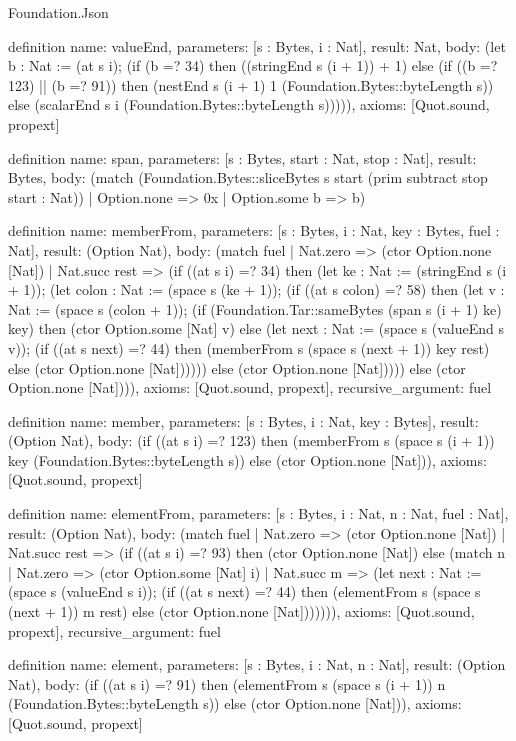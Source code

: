 \begin{lexlean}{Foundation.Json}
\begin{semanticmodule}
definition{
  name: valueEnd,
  parameters: [s : Bytes, i : Nat],
  result: Nat,
  body: (let b : Nat := (at s i); (if (b =? 34) then ((stringEnd s (i + 1)) + 1) else (if ((b =? 123) || (b =? 91)) then (nestEnd s (i + 1) 1 (Foundation.Bytes::byteLength s)) else (scalarEnd s i (Foundation.Bytes::byteLength s))))),
  axioms: [Quot.sound, propext]
}

definition{
  name: span,
  parameters: [s : Bytes, start : Nat, stop : Nat],
  result: Bytes,
  body: (match (Foundation.Bytes::sliceBytes s start (prim subtract stop start : Nat))
    | Option.none => 0x
    | Option.some b => b)
}

definition{
  name: memberFrom,
  parameters: [s : Bytes, i : Nat, key : Bytes, fuel : Nat],
  result: (Option Nat),
  body: (match fuel
    | Nat.zero => (ctor Option.none [Nat])
    | Nat.succ rest => (if ((at s i) =? 34) then (let ke : Nat := (stringEnd s (i + 1)); (let colon : Nat := (space s (ke + 1)); (if ((at s colon) =? 58) then (let v : Nat := (space s (colon + 1)); (if (Foundation.Tar::sameBytes (span s (i + 1) ke) key) then (ctor Option.some [Nat] v) else (let next : Nat := (space s (valueEnd s v)); (if ((at s next) =? 44) then (memberFrom s (space s (next + 1)) key rest) else (ctor Option.none [Nat]))))) else (ctor Option.none [Nat])))) else (ctor Option.none [Nat]))),
  axioms: [Quot.sound, propext],
  recursive_argument: fuel
}

definition{
  name: member,
  parameters: [s : Bytes, i : Nat, key : Bytes],
  result: (Option Nat),
  body: (if ((at s i) =? 123) then (memberFrom s (space s (i + 1)) key (Foundation.Bytes::byteLength s)) else (ctor Option.none [Nat])),
  axioms: [Quot.sound, propext]
}

definition{
  name: elementFrom,
  parameters: [s : Bytes, i : Nat, n : Nat, fuel : Nat],
  result: (Option Nat),
  body: (match fuel
    | Nat.zero => (ctor Option.none [Nat])
    | Nat.succ rest => (if ((at s i) =? 93) then (ctor Option.none [Nat]) else (match n
      | Nat.zero => (ctor Option.some [Nat] i)
      | Nat.succ m => (let next : Nat := (space s (valueEnd s i)); (if ((at s next) =? 44) then (elementFrom s (space s (next + 1)) m rest) else (ctor Option.none [Nat])))))),
  axioms: [Quot.sound, propext],
  recursive_argument: fuel
}

definition{
  name: element,
  parameters: [s : Bytes, i : Nat, n : Nat],
  result: (Option Nat),
  body: (if ((at s i) =? 91) then (elementFrom s (space s (i + 1)) n (Foundation.Bytes::byteLength s)) else (ctor Option.none [Nat])),
  axioms: [Quot.sound, propext]
}


\end{semanticmodule}
\end{lexlean}
